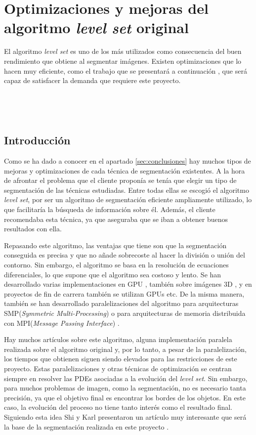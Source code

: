 \chapter{Optimizaciones y mejoras del algoritmo \textit{level set} original} 


El algoritmo \textit{level set} es uno de los m\'{a}s utilizados  como consecuencia del buen rendimiento que obtiene al segmentar im\'{a}genes. Existen optimizaciones que lo hacen muy eficiente, como el trabajo que se presentar\'{a} a continuaci\'{o}n \cite{yong1}, que ser\'{a} capaz de satisfacer la demanda que requiere este proyecto.

\

\

\section{Introducci\'{o}n}

Como se ha dado a conocer en el apartado \ref{sec:conclusiones} hay muchos tipos de mejoras y optimizaciones de cada t\'{e}cnica de segmentaci\'{o}n existentes. A la hora de afrontar el problema que el cliente propon\'{i}a se ten\'{i}a que elegir un tipo de segmentaci\'{o}n de las t\'{e}cnicas estudiadas. Entre todas ellas se escogi\'{o} el algoritmo \textit{level set}, por ser un algoritmo de segmentaci\'{o}n eficiente ampliamente utilizado, lo que facilitar\'{i}a la b\'{u}squeda de informaci\'{o}n sobre \'{e}l. Adem\'{a}s, el cliente recomendaba esta t\'{e}cnica, ya que aseguraba que se iban a obtener buenos resultados con ella.

Repasando este algoritmo, las ventajas que tiene son que la segmentaci\'{o}n conseguida es precisa y que no a\~{n}ade sobrecoste al hacer la divisi\'{o}n o uni\'{o}n del contorno. Sin embargo, el algoritmo se basa en la resoluci\'{o}n de ecuaciones diferenciales, lo que supone que el algoritmo sea costoso y lento. Se han desarrollado varias implementaciones en GPU \cite{eri2015}, tambi\'{e}n sobre im\'{a}genes 3D \cite{aaron1}, y en proyectos de fin de carrera tambi\'{e}n se utilizan GPUs \cite{cudaseg} etc. De la misma manera, tambi\'{e}n se han desarrollado paralelizaciones del algoritmo para arquitecturas SMP(\textit{Symmetric Multi-Processing}) \cite{jeon1} o para arquitecturas de memoria distribuida con MPI(\textit{Message Passing Interface})  \cite{moha1}. 

Hay muchos art\'{i}culos sobre este algoritmo, alguna implementaci\'{o}n paralela realizada sobre el algoritmo original y, por lo tanto, a pesar de la paralelizaci\'{o}n, los tiempos que obtienen siguen siendo elevados para las restricciones de este proyecto. Estas paralelizaciones y otras t\'{e}cnicas de optimizaci\'{o}n se centran siempre en resolver las PDEs asociadas a la evoluci\'{o}n del \textit{level set}. Sin embargo, para muchos problemas de imagen, como la segmentaci\'{o}n, no es necesario tanta precisi\'{o}n, ya que el objetivo final es encontrar los bordes de los objetos. En este caso, la evoluci\'{o}n del proceso no tiene tanto inter\'{e}s como el resultado final. Siguiendo esta idea Shi y Karl presentaron un art\'{i}culo muy interesante que ser\'{a} la base de la segmentaci\'{o}n realizada en este proyecto \cite{yong1}.

